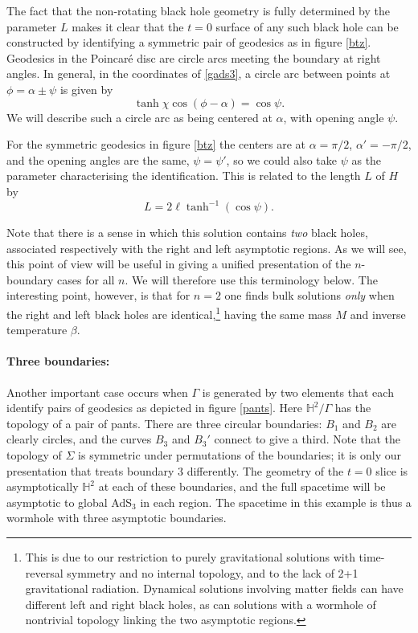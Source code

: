 \documentclass[12pt]{article}
\newcommand{\HH}{\mathbb{H}}
\newcommand{\be}{\begin{equation}}
\newcommand{\ee}{\end{equation}}
\numberwithin{equation}{section}
\begin{document}
The fact that the non-rotating black hole geometry is fully determined by the parameter $L$ makes it clear that the $t=0$ surface of any such black hole can be constructed by identifying a symmetric pair of geodesics as in figure \ref{btz}. Geodesics in the Poincar\'e disc are circle arcs meeting the boundary at right angles. In general, in the coordinates of \eqref{gads3}, a circle arc between points at $\phi = \alpha \pm \psi$ is given by
%
\be
\tanh \chi \cos (\phi - \alpha) = \cos \psi.
\ee
%
We will describe such a circle arc as being centered at $\alpha$, with opening angle $\psi$.

For the symmetric geodesics in figure \ref{btz} the centers are at $\alpha = \pi/2$, $\alpha' = - \pi/2$, and the opening angles are the same, $\psi = \psi'$, so we could also take $\psi$ as the parameter characterising the identification. This is related to the length $L$ of $H$ by
%
\be \label{length}
L = 2 \ell \tanh^{-1} (\cos \psi).
\ee
%

Note that there is a sense in which this solution contains {\it two} black holes, associated respectively with the right and left asymptotic regions.  As we will see, this point of view will be useful in giving a unified presentation of the $n$-boundary cases for all $n$.  We will therefore use this terminology below.  The interesting point, however, is that for $n=2$ one finds bulk solutions {\it only} when the right and left black holes are identical,\footnote{This is due to our restriction to purely gravitational solutions with time-reversal symmetry and no internal topology, and to the lack of 2+1 gravitational radiation.  Dynamical solutions involving matter fields can have  different left and right black holes, as can solutions with a wormhole of nontrivial topology linking the two asymptotic regions.} having the same mass $M$ and inverse temperature $\beta$.

\paragraph{Three boundaries:} Another important case occurs when $\Gamma$ is generated by two elements that each identify pairs of geodesics as depicted in figure \ref{pants}.  Here $\HH^2/\Gamma$ has the topology of a pair of pants.  There are three circular boundaries: $B_1$  and $B_2$ are clearly circles, and the curves $B_3$ and $B_3'$ connect to give a third.  Note that the topology of $\Sigma$ is symmetric under permutations of the boundaries; it is only our presentation that treats boundary $3$ differently. The geometry of the $t=0$ slice is asymptotically $\HH^2$ at each of these boundaries, and the full spacetime will be asymptotic to global AdS$_3$ in each region. The spacetime in this example is thus a wormhole with three asymptotic boundaries.
\end{document}
